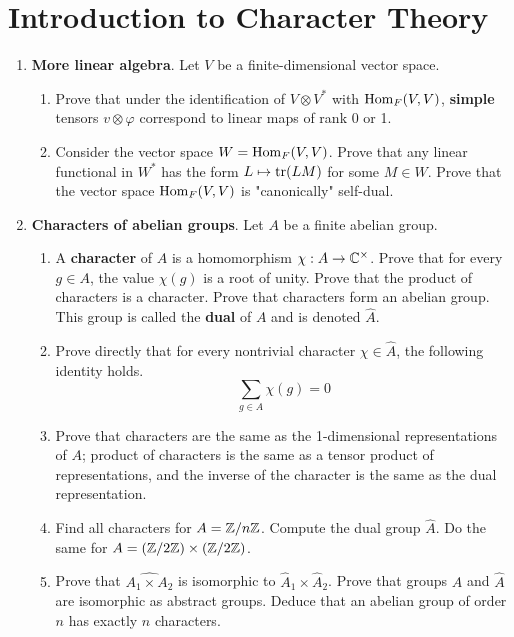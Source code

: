 \documentclass[../psets.tex]{subfiles}
\begin{document}
\section{Introduction to Character Theory}
\begin{enumerate}
    \item {}\textbf{More linear algebra}. Let $V$ be a finite-dimensional vector space.
    \begin{enumerate}
        \item Prove that under the identification of $V\otimes V^*$ with $\operatorname{Hom}_F(V,V)$, \textbf{simple} tensors $v\otimes\varphi$ correspond to linear maps of rank 0 or 1.
        \item Consider the vector space $W=\operatorname{Hom}_F(V,V)$. Prove that any linear functional in $W^*$ has the form $L\mapsto\tr(LM)$ for some $M\in W$. Prove that the vector space $\operatorname{Hom}_F(V,V)$ is "canonically" self-dual.
    \end{enumerate}
    \item \textbf{Characters of abelian groups}. Let $A$ be a finite abelian group.
    \begin{enumerate}
        \item A \textbf{character} of $A$ is a homomorphism $\chi:A\to\mathbb{C}^\times$. Prove that for every $g\in A$, the value $\chi(g)$ is a root of unity. Prove that the product of characters is a character. Prove that characters form an abelian group. This group is called the \textbf{dual} of $A$ and is denoted $\widehat{A}$.
        \item Prove directly that for every nontrivial character $\chi\in\widehat{A}$, the following identity holds.
        \begin{equation*}
            \sum_{g\in A}\chi(g) = 0
        \end{equation*}
        \item Prove that characters are the same as the 1-dimensional representations of $A$; product of characters is the same as a tensor product of representations, and the inverse of the character is the same as the dual representation.
        \item Find all characters for $A=\mathbb{Z}/n\mathbb{Z}$. Compute the dual group $\widehat{A}$. Do the same for $A=(\mathbb{Z}/2\mathbb{Z})\times(\mathbb{Z}/2\mathbb{Z})$.
        \item Prove that $\widehat{A_1\times A_2}$ is isomorphic to $\widehat{A}_1\times\widehat{A}_2$. Prove that groups $A$ and $\widehat{A}$ are isomorphic as abstract groups. Deduce that an abelian group of order $n$ has exactly $n$ characters.

\end{enumerate}
\end{enumerate}
\end{document}
